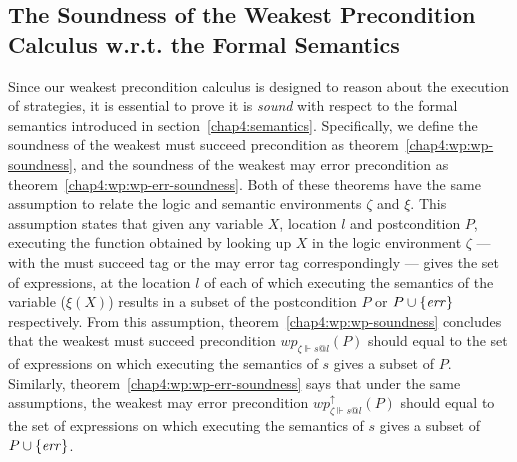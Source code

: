 \subsection{The Soundness of the Weakest Precondition Calculus w.r.t. the Formal Semantics}
Since our weakest precondition calculus is designed to reason about the execution of strategies, it is essential to prove it is \textit{sound} with respect to the formal semantics introduced in section~\ref{chap4:semantics}. Specifically, we define the soundness of the weakest must succeed precondition as theorem~\ref{chap4:wp:wp-soundness}, and the soundness of the weakest may error precondition as theorem~\ref{chap4:wp:wp-err-soundness}. Both of these theorems have the same assumption to relate the logic and semantic environments $\zeta$ and $\xi$. This assumption states that given any variable $X$, location $l$ and postcondition $P$, executing the function obtained by looking up $X$ in the logic environment $\zeta$ --- with the must succeed tag or the may error tag correspondingly --- gives the set of expressions, at the location $l$ of each of which executing the semantics of the variable ($\xi(X)$) results in a subset of the postcondition $P$ or $P\cup \{\mathit{err}\}$ respectively. From this assumption, theorem~\ref{chap4:wp:wp-soundness} concludes that the weakest must succeed precondition $wp_{\zeta \Vdash s@l}(P)$ should equal to the set of expressions on which executing the semantics of $s$ gives a subset of $P$. Similarly, theorem~\ref{chap4:wp:wp-err-soundness} says that under the same assumptions, the weakest may error precondition $wp_{\zeta \Vdash s@l}^\uparrow(P)$ should equal to the set of expressions on which executing the semantics of $s$ gives a subset of $P\cup \{\mathit{err}\}$.

